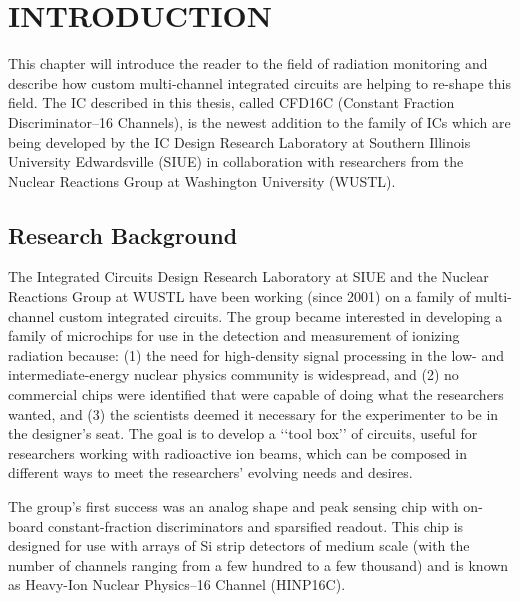\documentclass[12pt,oneside,final]{siuethesis}
\theoremstyle{definition}
\begin{document}
\listoftables

\mainmatter %


\chapter{INTRODUCTION}  %

This chapter will introduce the reader to the field of radiation monitoring and describe how custom multi-channel integrated circuits are helping to re-shape this field.  The IC described in this thesis, called CFD16C (Constant Fraction Discriminator--16 Channels), is the newest addition to the family of ICs which are being developed by the IC Design Research Laboratory at Southern Illinois University Edwardsville (SIUE) in collaboration with researchers from the Nuclear Reactions Group at Washington University (WUSTL).

\section{Research Background}

The Integrated Circuits Design Research Laboratory at SIUE and the Nuclear Reactions Group at WUSTL have been working (since 2001) on a family of multi-channel custom integrated circuits.  The group became interested in developing a family of microchips for use in the detection and measurement of ionizing radiation because: (1) the need for high-density signal processing in the low- and intermediate-energy nuclear physics community is widespread, and (2) no commercial chips were identified that were capable of doing what the researchers wanted, and (3) the scientists deemed it necessary for the experimenter to be in the designer's seat. The goal is to develop a ‘‘tool box’’ of circuits,
useful for researchers working with radioactive ion beams, which can be composed in different ways to meet the researchers' evolving needs and desires.

 
The group's first success was an analog shape and peak sensing chip with on-board constant-fraction discriminators and
sparsified readout. This chip is designed for use with arrays of Si strip detectors of medium scale (with the number of channels ranging from a few hundred to a few thousand) and is known as Heavy-Ion Nuclear Physics--16 Channel (HINP16C). 
\end{document}
